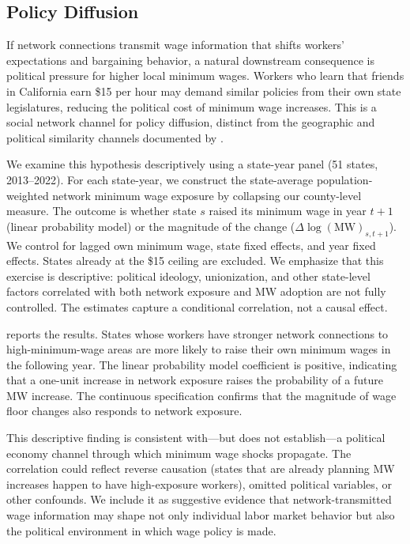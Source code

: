 \documentclass[12pt]{article}
\begin{document}
\subsection{Policy Diffusion}

If network connections transmit wage information that shifts workers' expectations and bargaining behavior, a natural downstream consequence is political pressure for higher local minimum wages. Workers who learn that friends in California earn \$15 per hour may demand similar policies from their own state legislatures, reducing the political cost of minimum wage increases. This is a social network channel for policy diffusion, distinct from the geographic and political similarity channels documented by \citet{shipan2008mechanisms}.

We examine this hypothesis descriptively using a state-year panel (51 states, 2013--2022). For each state-year, we construct the state-average population-weighted network minimum wage exposure by collapsing our county-level measure. The outcome is whether state $s$ raised its minimum wage in year $t+1$ (linear probability model) or the magnitude of the change ($\Delta\log(\text{MW})_{s,t+1}$). We control for lagged own minimum wage, state fixed effects, and year fixed effects. States already at the \$15 ceiling are excluded. We emphasize that this exercise is descriptive: political ideology, unionization, and other state-level factors correlated with both network exposure and MW adoption are not fully controlled. The estimates capture a conditional correlation, not a causal effect.



 reports the results. States whose workers have stronger network connections to high-minimum-wage areas are more likely to raise their own minimum wages in the following year. The linear probability model coefficient is positive, indicating that a one-unit increase in network exposure raises the probability of a future MW increase. The continuous specification confirms that the magnitude of wage floor changes also responds to network exposure.

This descriptive finding is consistent with---but does not establish---a political economy channel through which minimum wage shocks propagate. The correlation could reflect reverse causation (states that are already planning MW increases happen to have high-exposure workers), omitted political variables, or other confounds. We include it as suggestive evidence that network-transmitted wage information may shape not only individual labor market behavior but also the political environment in which wage policy is made.
\end{document}
